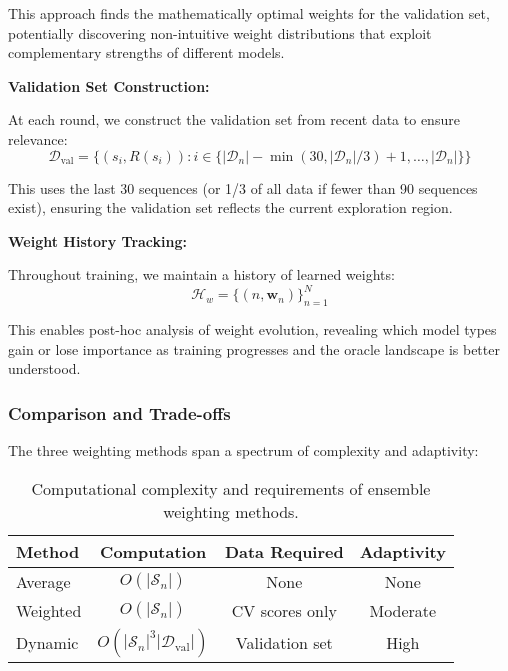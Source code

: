 \documentclass[conference]{IEEEtran}
\begin{document}
This approach finds the mathematically optimal weights for the validation set, potentially discovering non-intuitive weight distributions that exploit complementary strengths of different models.

\textbf{Validation Set Construction:}

At each round, we construct the validation set from recent data to ensure relevance:
\begin{equation}
\mathcal{D}_{\text{val}} = \{(s_i, R(s_i)) : i \in \{|\mathcal{D}_n| - \min(30, |\mathcal{D}_n|/3) + 1, \ldots, |\mathcal{D}_n|\}\}
\end{equation}

This uses the last 30 sequences (or 1/3 of all data if fewer than 90 sequences exist), ensuring the validation set reflects the current exploration region.

\textbf{Weight History Tracking:}

Throughout training, we maintain a history of learned weights:
\begin{equation}
\mathcal{H}_w = \{(n, \mathbf{w}_n)\}_{n=1}^{N}
\end{equation}

This enables post-hoc analysis of weight evolution, revealing which model types gain or lose importance as training progresses and the oracle landscape is better understood.

\subsubsection{Comparison and Trade-offs}

The three weighting methods span a spectrum of complexity and adaptivity:

\begin{table}[h]
\centering
\begin{tabular}{lccc}
\hline
\textbf{Method} & \textbf{Computation} & \textbf{Data Required} & \textbf{Adaptivity} \\
\hline
Average & $O(|\mathcal{S}_n|)$ & None & None \\
Weighted & $O(|\mathcal{S}_n|)$ & CV scores only & Moderate \\
Dynamic & $O(|\mathcal{S}_n|^3 |\mathcal{D}_{\text{val}}|)$ & Validation set & High \\
\hline
\end{tabular}
\caption{Computational complexity and requirements of ensemble weighting methods.}
\end{table}
\end{document}
